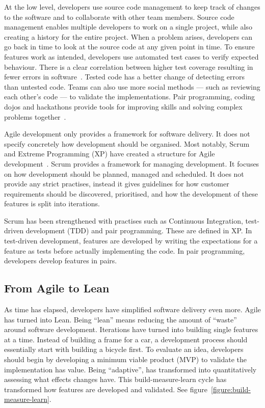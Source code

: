 \documentclass[english]{tktltiki2}
\begin{document}
At the low level, developers use source code management to keep track of changes to the software and to collaborate with other team members. Source code management enables multiple developers to work on a single project, while also creating a history for the entire project. When a problem arises, developers can go back in time to look at the source code at any given point in time. To ensure features work as intended, developers use automated test cases to verify expected behaviour. There is a clear correlation between higher test coverage resulting in fewer errors in software~\cite{MND09}. Tested code has a better change of detecting errors than untested code. Teams can also use more social methods — such as reviewing each other’s code — to validate the implementations. Pair programming, coding dojos and hackathons provide tools for improving skills and solving complex problems together~\cite{HHL13}.

Agile development only provides a framework for software delivery. It does not specify concretely how development should be organised. Most notably, Scrum and Extreme Programming (XP) have created a structure for Agile development~\cite{LB03, Fow05, SS10}. Scrum provides a framework for managing development. It focuses on how development should be planned, managed and scheduled. It does not provide any strict practises, instead it gives guidelines for how customer requirements should be discovered, prioritised, and how the development of these features is split into iterations.

Scrum has been strengthened with practises such as Continuous Integration, test-driven development (TDD) and pair programming. These are defined in XP. In test-driven development, features are developed by writing the expectations for a feature as tests before actually implementing the code. In pair programming, developers develop features in pairs.

\subsection{From Agile to Lean}

As time has elapsed, developers have simplified software delivery even more. Agile has turned into Lean. Being “lean” means reducing the amount of “waste” around software development. Iterations have turned into building single features at a time. Instead of building a frame for a car, a development process should essentially start with building a bicycle first. To evaluate an idea, developers should begin by developing a minimum viable product (MVP) to validate the implementation has value. Being “adaptive”, has transformed into quantitatively assessing what effects changes have. This build-measure-learn cycle has transformed how features are developed and validated. See figure~\ref{figure:build-measure-learn}.
\end{document}
